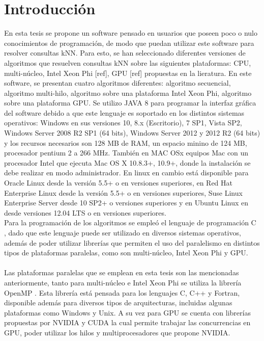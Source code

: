\chapter[Introducción]{\label{ch:intro}Introducción}

En esta tesis se propone un software pensado en usuarios que poseen poco o nulo conocimientos de programación, de modo que puedan utilizar este software para resolver consultas kNN. Para esto, se han seleccionado diferentes versiones de algoritmos que resuelven consultas kNN sobre las siguientes plataformas: CPU, multi-núcleo, Intel Xeon Phi [ref], GPU [ref] propuestas en la lieratura. En este software, se presentan cuatro algoritmos diferentes: algoritmo secuencial, algoritmo multi-hilo, algoritmo sobre una plataforma Intel Xeon Phi, algoritmo sobre una plataforma GPU.
Se utilizo JAVA 8 \cite{java} para programar la interfaz gráfica del software debido a que este lenguaje es soportado en los distintos sistemas operativos: Windows en sus versiones 10, 8.x (Escritorio), 7 SP1, Vista SP2, Windows Server 2008 R2 SP1 (64 bits), Windows Server 2012 y 2012 R2 (64 bits) y los recursos necesarios son 128 MB de RAM, un espacio minino de 124 MB, procesador pentium 2 a 266 MHz. También en MAC OSx equipos Mac con un procesador Intel que ejecuta Mac OS X 10.8.3+, 10.9+, donde la instalación se debe realizar en modo administrador. En linux en cambio está disponible para Oracle Linux desde la versión 5.5+ o en versiones superiores, en Red Hat Enterprise Linux desde la versión 5.5+ o en versiones superiores, Suse Linux Enterprise Server desde 10 SP2+ o versiones superiores y en Ubuntu Linux en desde versiones 12.04 LTS o en versiones superiores.\\

Para la programación de los algoritmos se empleó el lenguaje de programación C \cite{c}, dado que este lenguaje puede ser utilizado en diversos sistemas operativos, además de poder utilizar librerías que permiten el uso del paralelismo en distintos tipos de plataformas paralelas, como son multi-núcleo, Intel Xeon Phi y GPU.\\
\\
Las plataformas paralelas que se emplean en esta tesis son las mencionadas anteriormente, tanto para multi-núcleo e Intel Xeon Phi se utiliza la librería OpenMP \cite{libroOpenMP}\cite{libroPthreads}. Esta librería está pensada para los lenguajes C, C++ y Fortran, disponible además para diversos tipos de arquitecturas, incluidas algunas plataformas como Windows y Unix.
A su vez para GPU se cuenta con librerías propuestas por NVIDIA y CUDA \cite{cuda} la cual permite trabajar las concurrencias en GPU, poder utilizar los hilos y multiprocesadores que propone NVIDIA.   


